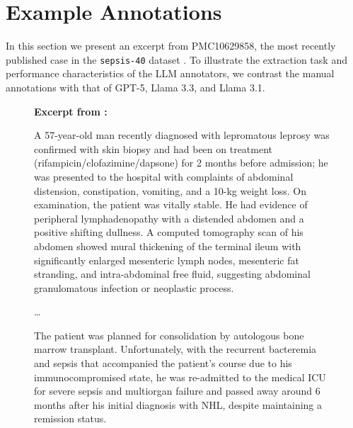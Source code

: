 \documentclass[pmlr,twocolumn,10pt]{jmlr} %
\begin{document}
\clearpage


\section{Example Annotations}\label{apd:excerpt}
In this section we present an excerpt from PMC10629858, the most recently published case in the \texttt{sepsis-40} dataset \citep{abu2023rare}. To illustrate the extraction task and performance characteristics of the LLM annotators, we contrast the manual annotations with that of GPT-5, Llama 3.3, and Llama 3.1.

\begin{figure}[!h]
\centering

\begin{tcolorbox}[
  enhanced,
  colback=gray!4,
  colframe=gray!35,
  boxrule=0.4pt,
  arc=2mm,
  left=3mm,right=3mm,top=2mm,bottom=2mm,
]

{\bfseries Excerpt from \cite{abu2023rare}:}
\vspace{2pt}

\begin{tcolorbox}[
  enhanced,
  colback=blue!3,
  colframe=blue!60!black,
  title=\textbf{PMC10629858},
  fonttitle=\small,
  boxrule=0.8pt,
  arc=2mm,
  left=3mm,right=3mm,top=2mm,bottom=2mm
]

\footnotesize

A 57-year-old man recently diagnosed with lepromatous leprosy was confirmed with skin biopsy and had been on treatment (rifampicin/clofazimine/dapsone) for 2 months before admission; he was presented to the hospital with complaints of abdominal distension, constipation, vomiting, and a 10-kg weight loss. On examination, the patient was vitally stable. He had evidence of peripheral lymphadenopathy with a distended abdomen and a positive shifting dullness. A computed tomography scan of his abdomen showed mural thickening of the terminal ileum with significantly enlarged mesenteric lymph nodes, mesenteric fat stranding, and intra-abdominal free fluid, suggesting abdominal granulomatous infection or neoplastic process.

\dots

The patient was planned for consolidation by autologous bone marrow transplant. Unfortunately, with the recurrent bacteremia and sepsis that accompanied the patient’s course due to his immunocompromised state, he was re-admitted to the medical ICU for severe sepsis and multiorgan failure and passed away around 6 months after his initial diagnosis with NHL, despite maintaining a remission status.


\end{tcolorbox}
\end{tcolorbox}
\end{figure}
\end{document}
